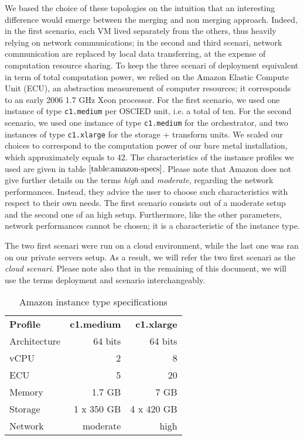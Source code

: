 \documentclass[a4paper, titlepage]{paper}
\numberwithin{figure}{section}
\numberwithin{table}{section}
\begin{document}
      We based the choice of these topologies on the intuition that an interesting difference would emerge between the merging and non merging approach. Indeed, in the first scenario, each VM lived separately from the others, thus heavily relying on network communications; in the second and third scenari, network communication are replaced by local data transferring, at the expense of computation resource sharing. To keep the three scenari of deployment equivalent in term of total computation power, we relied on the Amazon Elastic Compute Unit (ECU), an abstraction measurement of computer resources; it corresponds to an early 2006 1.7 GHz Xeon processor. For the first scenario, we used one instance of type \texttt{c1.medium} per OSCIED unit, i.e. a total of ten. For the second scenario, we used one instance of type \texttt{c1.medium} for the orchestrator, and two instances of type \texttt{c1.xlarge} for the storage + transform units. We scaled our choices to correspond to the computation power of our bare metal installation, which approximately equals to 42. The characteristics of the instance profiles we used are given in table $\ref{table:amazon-specs}$. Please note that Amazon does not give further details on the terms \emph{high} and \emph{moderate}, regarding the network performances. Instead, they advice the user to choose such characteristics with respect to their own needs. The first scenario consists out of a moderate setup and the second one of an high setup. Furthermore, like the other parameters, network performances cannot be chosen; it is a characteristic of the instance type.

      The two first scenari were run on a cloud environment, while the last one was ran on our private servers setup. As a result, we will refer the two first scenari as the \emph{cloud scenari}. Please note also that in the remaining of this document, we will use the terms deployment and scenario interchangeably.

      \begin{table}[ht]
        \centering
        \begin{tabular}{lrr}
          \textbf{Profile}  & \textbf{c1.medium}  & \textbf{c1.xlarge}  \\
          Architecture      & 64 bits             & 64 bits             \\
          vCPU              & 2                   & 8                   \\
          ECU               & 5                   & 20                  \\
          Memory            & 1.7 GB              & 7 GB                \\
          Storage           & 1 x 350 GB          & 4 x 420 GB          \\
          Network           & moderate            & high  
        \end{tabular}
        \caption{Amazon instance type specifications}
        \label{table:amazon-specs}
      \end{table}
\end{document}

